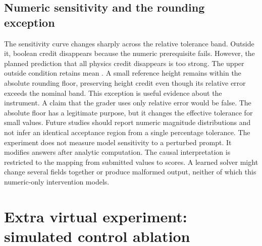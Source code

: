 \documentclass{article}
\begin{document}
\subsection{Numeric sensitivity and the rounding exception}
\begin{table}[ht]\centering\small\caption{Controlled numeric perturbations. The multiplier changes both exact physics values. Brackets are 95\% intervals with the same units as Table 2.}\end{table}

The sensitivity curve changes sharply across the relative tolerance band. Outside it, boolean credit disappears because the numeric prerequisite fails. However, the planned prediction that all physics credit disappears is too strong. The upper outside condition retains mean \SensitivityOutside{}. A small reference height remains within the absolute rounding floor, preserving height credit even though its relative error exceeds the nominal band.
This exception is useful evidence about the instrument. A claim that the grader uses only relative error would be false. The absolute floor has a legitimate purpose, but it changes the effective tolerance for small values. Future studies should report numeric magnitude distributions and not infer an identical acceptance region from a single percentage tolerance.
The experiment does not measure model sensitivity to a perturbed prompt. It modifies answers after analytic computation. The causal interpretation is restricted to the mapping from submitted values to scores. A learned solver might change several fields together or produce malformed output, neither of which this numeric-only intervention models.
\section{Extra virtual experiment: simulated control ablation}
\end{document}
